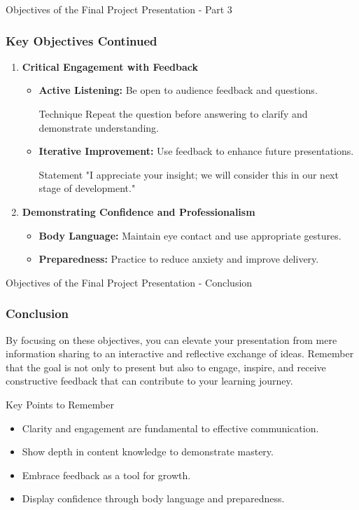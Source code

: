 \documentclass[aspectratio=169]{beamer}
\begin{document}
\begin{frame}[fragile]{Objectives of the Final Project Presentation - Part 3}
    \frametitle{Key Objectives Continued}
    \begin{enumerate}[resume]
        \item \textbf{Critical Engagement with Feedback}
            \begin{itemize}
                \item \textbf{Active Listening:} Be open to audience feedback and questions.
                    \begin{block}{Technique}
                        Repeat the question before answering to clarify and demonstrate understanding.
                    \end{block}
                \item \textbf{Iterative Improvement:} Use feedback to enhance future presentations.
                    \begin{block}{Statement}
                        "I appreciate your insight; we will consider this in our next stage of development."
                    \end{block}
            \end{itemize}

        \item \textbf{Demonstrating Confidence and Professionalism}
            \begin{itemize}
                \item \textbf{Body Language:} Maintain eye contact and use appropriate gestures.
                \item \textbf{Preparedness:} Practice to reduce anxiety and improve delivery.
            \end{itemize}
    \end{enumerate}
\end{frame}

\begin{frame}[fragile]{Objectives of the Final Project Presentation - Conclusion}
    \frametitle{Conclusion}
    By focusing on these objectives, you can elevate your presentation from mere information sharing to an interactive and reflective exchange of ideas. 
    Remember that the goal is not only to present but also to engage, inspire, and receive constructive feedback that can contribute to your learning journey. 

    \begin{block}{Key Points to Remember}
        \begin{itemize}
            \item Clarity and engagement are fundamental to effective communication.
            \item Show depth in content knowledge to demonstrate mastery.
            \item Embrace feedback as a tool for growth.
            \item Display confidence through body language and preparedness.
        \end{itemize}
    \end{block}
\end{frame}
\end{document}
